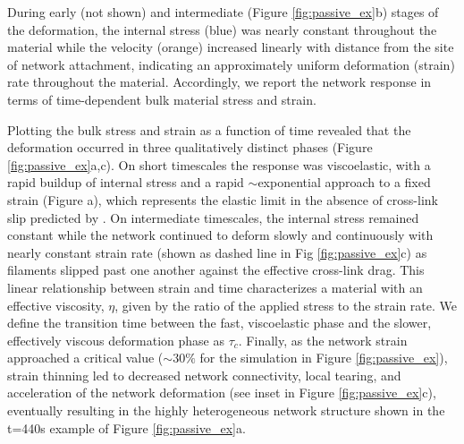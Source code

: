 \documentclass[10pt,letterpaper]{article}
\begin{document}
During early (not shown) and intermediate (Figure \ref{fig:passive_ex}b) stages of the deformation, the internal stress (blue) was nearly constant throughout the material while the velocity (orange) increased linearly with distance from the site of network attachment, indicating an approximately uniform deformation (strain) rate throughout the material. Accordingly, we report the network response in terms of time-dependent bulk material stress and strain.

Plotting the bulk stress and strain as a function of time revealed that the deformation occurred in three qualitatively distinct phases (Figure \ref{fig:passive_ex}a,c). On short timescales the response was viscoelastic, with a rapid buildup of internal stress and a rapid $\sim$exponential approach to a fixed strain (Figure a), which represents the elastic limit in the absence of cross-link slip predicted by \cite{theo_hlm}. On intermediate timescales, the internal stress remained constant while the network continued to deform slowly and continuously with nearly constant strain rate (shown as dashed line in Fig \ref{fig:passive_ex}c) as filaments slipped past one another against the effective cross-link drag. This linear relationship between strain and time characterizes a material with an effective viscosity, $\eta$, given by the ratio of the applied stress to the strain rate. We define the transition time between the fast, viscoelastic phase and the slower, effectively viscous deformation phase as $\tau_c$. Finally, as the network strain approached a critical value ($\sim 30\%$ for the simulation in Figure \ref{fig:passive_ex}), strain thinning led to decreased network connectivity, local tearing, and acceleration of the network deformation (see inset in Figure \ref{fig:passive_ex}c), eventually resulting in the highly heterogeneous network structure shown in the t=440s example of Figure \ref{fig:passive_ex}a. 
\end{document}
